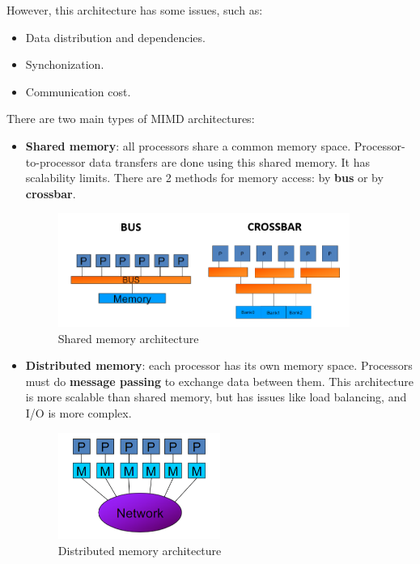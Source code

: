 However, this architecture has some issues, such as:

\begin{itemize}
    \item Data distribution and dependencies.
    \item Synchonization.
    \item Communication cost.
\end{itemize}

There are two main types of MIMD architectures:

\begin{itemize}
    \item \textbf{Shared memory}: all processors share a common memory space. 
    Processor-to-processor data transfers are done using this shared memory. It has
    scalability limits. There are 2 methods for memory access: by \textbf{bus} or by
    \textbf{crossbar}.

    \begin{figure}[H]
        \centering
        \includegraphics[width=0.9\textwidth]{figures/shared_mem.png}
        \caption{Shared memory architecture}
        \label{fig:shared_mem}
    \end{figure}

    \item \textbf{Distributed memory}: each processor has its own memory space. Processors
    must do \textbf{message passing} to exchange data between them. This architecture is more
    scalable than shared memory, but has issues like load balancing, and I/O is more
    complex.

    \begin{figure}[H]
        \centering
        \includegraphics[width=0.5\textwidth]{figures/distrib_mem.png}
        \caption{Distributed memory architecture}
        \label{fig:dist_mem}
    \end{figure}
\end{itemize}

